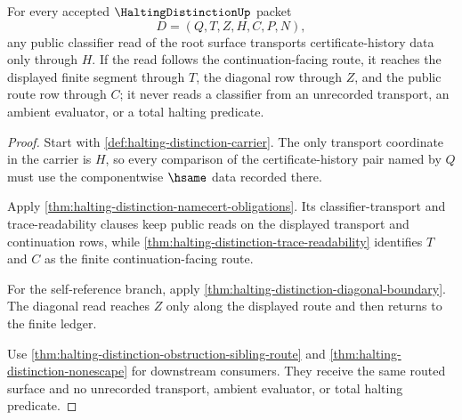 \begin{theorem}
\label{thm:halting-distinction-root-classifier-transport}
For every accepted $\HaltingDistinctionUp$ packet
$$
D=(Q,T,Z,H,C,P,N),
$$
any public classifier read of the root surface transports certificate-history data only through $H$. If the read follows the continuation-facing route, it reaches the displayed finite segment through $T$, the diagonal row through $Z$, and the public route row through $C$; it never reads a classifier from an unrecorded transport, an ambient evaluator, or a total halting predicate.
\end{theorem}
\begin{proof}
Start with \autoref{def:halting-distinction-carrier}. The only transport coordinate in the carrier is $H$, so every comparison of the certificate-history pair named by $Q$ must use the componentwise $\hsame$ data recorded there.

Apply \autoref{thm:halting-distinction-namecert-obligations}. Its classifier-transport and trace-readability clauses keep public reads on the displayed transport and continuation rows, while \autoref{thm:halting-distinction-trace-readability} identifies $T$ and $C$ as the finite continuation-facing route.

For the self-reference branch, apply \autoref{thm:halting-distinction-diagonal-boundary}. The diagonal read reaches $Z$ only along the displayed route and then returns to the finite ledger.

Use \autoref{thm:halting-distinction-obstruction-sibling-route} and \autoref{thm:halting-distinction-nonescape} for downstream consumers. They receive the same routed surface and no unrecorded transport, ambient evaluator, or total halting predicate.
\end{proof}

